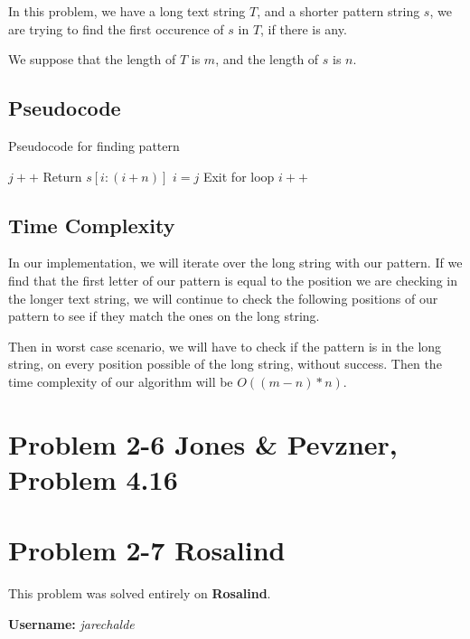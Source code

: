 \documentclass{article}
\begin{document}
In this problem, we have a long text string $T$, and a shorter pattern string $s$, we are trying to find the first occurence of $s$ in $T$, if there is any.

We suppose that the length of $T$ is $m$, and the length of $s$ is $n$.

\subsection*{Pseudocode}

\begin{algorithm}[H]
\caption{Pseudocode for finding pattern}
\begin{algorithmic}
       \State $j++$
      \EndIf
       \State Return $s[i:(i+n)]$
      \EndIf
     \EndIf
      \State $i = j$
      \State Exit for loop
     \EndIf
    \EndFor
  \EndIf
   \State $i++$
  \EndIf
 \EndWhile
\EndFunction
\end{algorithmic}
\end{algorithm}

\subsection*{Time Complexity}

In our implementation, we will iterate over the long string with our pattern. If we find that the first letter of our pattern is equal to the position we are checking in the longer text string, we will continue to check the following positions of our pattern to see if they match the ones on the long string. 

Then in worst case scenario, we will have to check if the pattern is in the long string, on every position possible of the long string, without success. Then the time complexity of our algorithm will be $O((m-n)*n)$.

\section*{Problem 2-6 Jones \& Pevzner, Problem 4.16}

\section*{Problem 2-7 Rosalind}

This problem was solved entirely on \textbf{Rosalind}.

\textbf{Username:} \textit{jarechalde}
\end{document}
